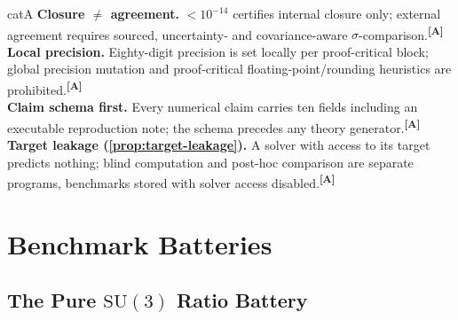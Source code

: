 \documentclass[12pt,a4paper,twoside]{article}
\theoremstyle{plain}
\theoremstyle{definition}
\theoremstyle{remark}
\newcommand{\catmark}[1]{\textsuperscript{\textsf{\textbf{[#1]}}}}
\begin{document}
\begin{evidencebox}{catA}
\textbf{Closure $\neq$ agreement.} $<10^{-14}$ certifies internal closure only; external agreement requires sourced, uncertainty- and covariance-aware
$\sigma$-comparison.\catmark{A}\\[0.3em]
\textbf{Local precision.} Eighty-digit precision is set locally per proof-critical block; global precision mutation and proof-critical
floating-point/rounding heuristics are prohibited.\catmark{A}\\[0.3em]
\textbf{Claim schema first.} Every numerical claim carries ten fields including an executable reproduction note; the schema precedes any theory
generator.\catmark{A}\\[0.3em]
\textbf{Target leakage (\cref{prop:target-leakage}).} A solver with access to its target predicts nothing; blind computation and post-hoc comparison are separate programs, benchmarks stored with solver access disabled.\catmark{A}
\end{evidencebox}


\section{Benchmark Batteries}
\label{sec:benchmark-batteries}

\subsection{The Pure \texorpdfstring{$\mathrm{SU}(3)$}{SU(3)} Ratio Battery}
\label{subsec:ratio-battery}
\end{document}
